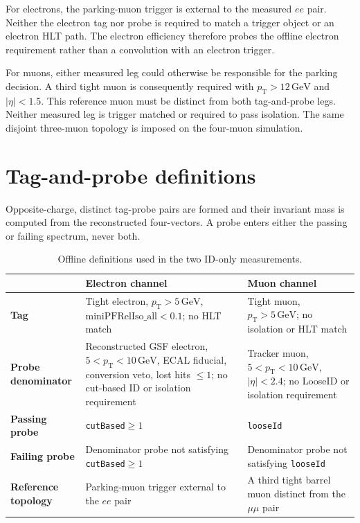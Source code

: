 \documentclass[11pt,a4paper]{article}
\newcommand{\pt}{p_{\mathrm{T}}}
\newcommand{\abseta}{|\eta|}
\begin{document}
For electrons, the parking-muon trigger is external to the measured $ee$ pair.  Neither the electron tag nor probe is required to match a trigger object or an electron HLT path.  The electron efficiency therefore probes the offline electron requirement rather than a convolution with an electron trigger.

For muons, either measured leg could otherwise be responsible for the parking decision.  A third tight muon is consequently required with $\pt>12\,\mathrm{GeV}$ and $\abseta<1.5$.  This reference muon must be distinct from both tag-and-probe legs.  Neither measured leg is trigger matched or required to pass isolation.  The same disjoint three-muon topology is imposed on the four-muon simulation.

\section{Tag-and-probe definitions}

Opposite-charge, distinct tag-probe pairs are formed and their invariant mass is computed from the reconstructed four-vectors.  A probe enters either the passing or failing spectrum, never both.

\begin{table}[htbp]
\centering
\caption{Offline definitions used in the two ID-only measurements.}
\begin{tabularx}{\textwidth}{>{\bfseries}p{24mm}XX}
\toprule
 & Electron channel & Muon channel \\
\midrule
Tag & Tight electron, $\pt>5\,\mathrm{GeV}$, $\mathrm{miniPFRelIso\_all}<0.1$; no HLT match & Tight muon, $\pt>5\,\mathrm{GeV}$; no isolation or HLT match \\
Probe denominator & Reconstructed GSF electron, $5<\pt<10\,\mathrm{GeV}$, ECAL fiducial, conversion veto, lost hits $\leq1$; no cut-based ID or isolation requirement & Tracker muon, $5<\pt<10\,\mathrm{GeV}$, $\abseta<2.4$; no LooseID or isolation requirement \\
Passing probe & \texttt{cutBased}$\geq1$ & \texttt{looseId} \\
Failing probe & Denominator probe not satisfying \texttt{cutBased}$\geq1$ & Denominator probe not satisfying \texttt{looseId} \\
Reference topology & Parking-muon trigger external to the $ee$ pair & A third tight barrel muon distinct from the $\mu\mu$ pair \\
\bottomrule
\end{tabularx}
\end{table}
\end{document}
